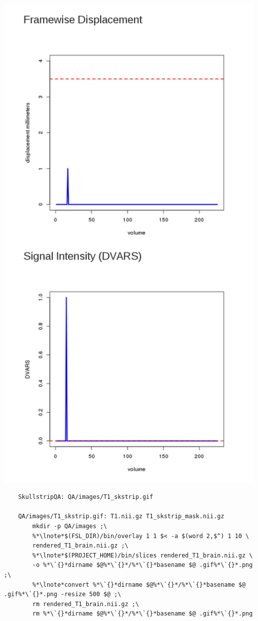 \includegraphics[scale=0.3]{images/QAmotion2.png}

\begin{lstlisting}
	SkullstripQA: QA/images/T1_skstrip.gif

	QA/images/T1_skstrip.gif: T1.nii.gz T1_skstrip_mask.nii.gz
		mkdir -p QA/images ;\
		%*\lnote*$(FSL_DIR)/bin/overlay 1 1 $< -a $(word 2,$^) 1 10 \
		rendered_T1_brain.nii.gz ;\
		%*\lnote*$(PROJECT_HOME)/bin/slices rendered_T1_brain.nii.gz \
		-o %*\`{}*dirname $@%*\`{}*/%*\`{}*basename $@ .gif%*\`{}*.png ;\
		%*\lnote*convert %*\`{}*dirname $@%*\`{}*/%*\`{}*basename $@ .gif%*\`{}*.png -resize 500 $@ ;\
		rm rendered_T1_brain.nii.gz ;\
		rm %*\`{}*dirname $@%*\`{}*/%*\`{}*basename $@ .gif%*\`{}*.png

\end{lstlisting}



